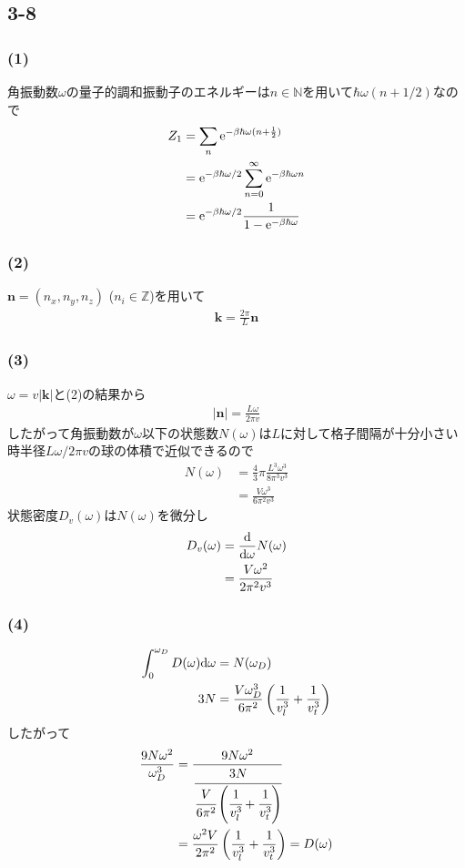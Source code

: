 \subsection*{3-8}
\subsubsection*{(1)}
角振動数$\omega$の量子的調和振動子のエネルギーは$n\in\mathbb{N}$を用いて$\hbar\omega(n+1/2)$なので
\begin{align}
  Z_1&=\sum_n{\rm e}^{-\beta\hbar\omega(n+\frac{1}{2})}\nonumber\\
  &={\rm e}^{-\beta\hbar\omega/2}\sum_{n=0}^{\infty}{\rm e}^{-\beta\hbar\omega n}\nonumber\\
  &={\rm e}^{-\beta\hbar\omega/2}\frac{1}{1-{\rm e}^{-\beta\hbar\omega}}
\end{align}
\subsubsection*{(2)}
$\bm{n}=(n_x,n_y,n_z)$ ($n_i\in\mathbb{Z}$)を用いて
\begin{align}
  \bm{k}=\frac{2\pi}{L}\bm{n}
\end{align}
\subsubsection*{(3)}
$\omega=v|\bm{k}|$と(2)の結果から
\begin{align}
  |\bm{n}|=\frac{L\omega}{2\pi v}
\end{align}
したがって角振動数が$\omega$以下の状態数$N(\omega)$は$L$に対して格子間隔が十分小さい時半径$L\omega/2\pi v$の球の体積で近似できるので
\begin{align}
  N(\omega)&=\frac{4}{3}\pi\frac{L^3\omega^3}{8\pi^3v^3}\nonumber\\
  &=\frac{V\omega^3}{6\pi^2v^3}
\end{align}
状態密度$D_v(\omega)$は$N(\omega)$を微分し
\begin{align}
  D_v(\omega)&=\frac{{\rm d}}{{\rm d}\omega}N(\omega)\nonumber\\
  &=\frac{V\omega^2}{2\pi^2v^3}
\end{align}
\subsubsection*{(4)}
\begin{align}
  \int^{\omega_D}_0D(\omega){\rm d}\omega&=N(\omega_D)\nonumber\\
  3N&=\frac{V\omega_D^3}{6\pi^2}\left(\frac{1}{v_l^3}+\frac{1}{v_t^3}\right)
\end{align}
したがって
\begin{align}
  \frac{9N\omega^2}{\omega_D^3}&=\frac{9N\omega^2}{\cfrac{3N}{\cfrac{V}{6\pi^2}\left(\cfrac{1}{v_l^3}+\cfrac{1}{v_t^3}\right)}}\nonumber\\
  &=\frac{\omega^2V}{2\pi^2}\left(\frac{1}{v_l^3}+\frac{1}{v_t^3}\right)=D(\omega)
\end{align}
